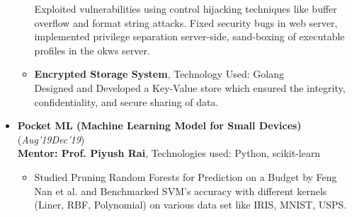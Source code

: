\documentclass[a4paper]{article}
\begin{document}
\begin{itemize}
\begin{itemize}
Exploited vulnerabilities using control hijacking techniques like buffer overflow and format string attacks. Fixed security bugs in web server, implemented privilege separation %
server-side, sand-boxing of executable profiles in the okws server.
\item \textbf{Encrypted Storage System}, Technology Used: Golang\\
Designed and Developed a Key-Value store which ensured the integrity, confidentiality, and secure sharing of data.
\end{itemize}
\item \textbf{Pocket ML (Machine Learning Model for Small Devices)} \hfill\hfill(\textit{Aug'19\textendash Dec'19})\\
\textbf{Mentor: Prof. Piyush Rai}, Technologies used: Python, scikit-learn
\begin{itemize}
\item Studied Pruning Random Forests for Prediction on a Budget by Feng Nan et al. and Benchmarked SVM's accuracy with different kernels (Liner, RBF, Polynomial) on various data set like IRIS, MNIST, USPS.
\end{itemize}
\end{itemize}
\vspace{-2mm}
\end{document}
